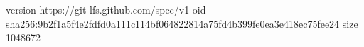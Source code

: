 version https://git-lfs.github.com/spec/v1
oid sha256:9b2f1a5f4e2fdfd0a111c114bf064822814a75fd4b399fe0ea3e418ec75fee24
size 1048672
